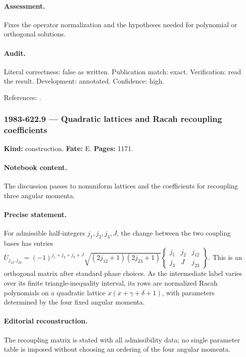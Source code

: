 \paragraph{Assessment.} Fixes the operator normalization and the hypotheses needed for polynomial or orthogonal solutions.

\paragraph{Audit.} Literal correctness: false as written. Publication match: exact. Verification: read the result. Development: annotated. Confidence: high.

\noindent References: \citep{nikiforovsuslovuvarov1985rotation}.\par

\subsubsection{1983-622.9 --- Quadratic lattices and Racah recoupling coefficients}

\label{item:1983-622.9}

\noindent\textbf{Kind:} construction. \textbf{Fate:} E. \textbf{Pages:} 1171.\par

\paragraph{Notebook content.} The discussion passes to nonuniform lattices and the coefficients for recoupling three angular momenta.

\paragraph{Precise statement.} For admissible half-integers \(j_1,j_2,j_3,J\), the change between the two coupling bases has entries \(U_{j_{12},j_{23}}=(-1)^{j_1+j_2+j_3+J}\sqrt{(2j_{12}+1)(2j_{23}+1)}\left\{\begin{smallmatrix}j_1&j_2&j_{12}\\j_3&J&j_{23}\end{smallmatrix}\right\}\). This is an orthogonal matrix after standard phase choices. As the intermediate label varies over its finite triangle-inequality interval, its rows are normalized Racah polynomials on a quadratic lattice \(x(x+\gamma+\delta+1)\), with parameters determined by the four fixed angular momenta.

\paragraph{Editorial reconstruction.} The recoupling matrix is stated with all admissibility data; no single parameter table is imposed without choosing an ordering of the four angular momenta.

